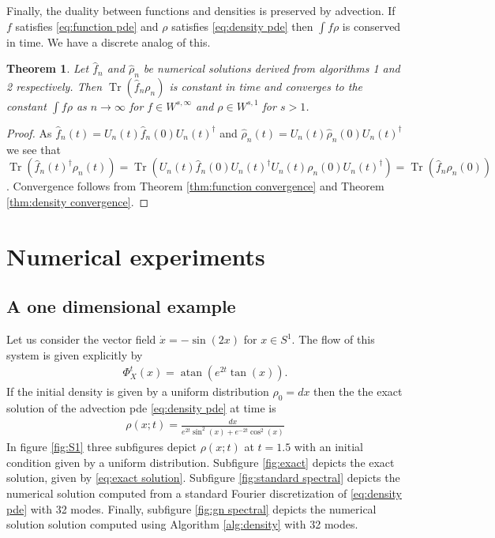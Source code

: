 \documentclass[12pt]{amsart}
\newtheorem{thm}{Theorem}[section]
\DeclareMathOperator{\Tr}{Tr}
\begin{document}
Finally, the duality between functions and densities is preserved by advection.  If $f$ satisfies \eqref{eq:function pde} and $\rho $ satisfies \eqref{eq:density pde} then $\int f \rho$ is conserved in time.
We have a discrete analog of this.
\begin{thm}
	Let $\hat{f}_{n}$ and $\hat{\rho}_{n}$ be numerical solutions derived from algorithms 1 and 2 respectively.
	Then $\Tr( \hat{f}_{n} \rho_{n} )$ is constant in time and converges to the constant $\int f \rho$ as $n \to \infty$
	for $f \in W^{s,\infty}$ and $\rho \in W^{s,1}$ for $s>1$.
\end{thm}
\begin{proof}
	As $\hat{f}_{n}(t) = U_{n}(t) \hat{f}_{n}(0) U_{n}(t)^{\dagger}$ and $\hat{\rho}_{n}(t) = U_{n}(t) \hat{\rho}_{n}(0) U_{n}(t)^{\dagger}$
	we see that $\Tr( \hat{f}_{n}(t)^{\dagger} \rho_{n}(t) ) = \Tr( U_{n}(t) \hat{f}_{n}(0) U_{n}(t)^{\dagger} U_{n}(t) \rho_{n}(0) U_{n}(t)^{\dagger}) = \Tr( \hat{f}_{n} \rho_{n}(0) )$.
	Convergence follows from Theorem \ref{thm:function convergence} and Theorem \ref{thm:density convergence}.
\end{proof}

\section{Numerical experiments}

\subsection{A one dimensional example}
Let us consider the vector field $\dot{x} = -\sin(2 x)$ for $x \in S^{1}$.
The flow of this system is given explicitly by
\begin{align}
	\Phi_{X}^{t}(x) = \operatorname{atan} \left( e^{2t} \tan( x) \right).
\end{align}
If the initial density is given by a uniform distribution $\rho_{0} = dx$ then the the exact solution of the advection pde \eqref{eq:density pde} at time is
\begin{align}
	\rho(x;t) =  \frac{dx}{e^{2t} \sin^{2}(x) + e^{-2t} \cos^{2}(x) } \label{eq:exact solution}
\end{align}
 In figure \ref{fig:S1} three subfigures depict $\rho(x;t)$ at $t=1.5$ with an initial condition given by a uniform distribution.
Subfigure \ref{fig:exact} depicts the exact solution, given by \eqref{eq:exact solution}.  Subfigure \ref{fig:standard spectral} depicts the numerical solution computed
from a standard Fourier discretization of \eqref{eq:density pde} with 32 modes.
Finally, subfigure \ref{fig:gn spectral} depicts the numerical solution solution computed using Algorithm \ref{alg:density} with 32 modes.
\end{document}
